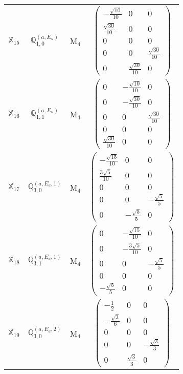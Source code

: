 \documentclass[fleqn,10pt,landscape]{article}
\begin{document}
\begin{itemize}
\begin{center}
\begin{longtable}{c|c|c|c}
$ \mathbb{X}_{15} $ & $\mathbb{Q}_{1,0}^{(a,E_{u})}$ & M$_{4}$ & $\begin{pmatrix} - \frac{\sqrt{10}}{10} & 0 & 0 \\ \frac{\sqrt{30}}{10} & 0 & 0 \\ 0 & 0 & 0 \\ 0 & 0 & \frac{\sqrt{30}}{10} \\ 0 & \frac{\sqrt{30}}{10} & 0 \end{pmatrix}$ \\
$ \mathbb{X}_{16} $ & $\mathbb{Q}_{1,1}^{(a,E_{u})}$ & M$_{4}$ & $\begin{pmatrix} 0 & - \frac{\sqrt{10}}{10} & 0 \\ 0 & - \frac{\sqrt{30}}{10} & 0 \\ 0 & 0 & \frac{\sqrt{30}}{10} \\ 0 & 0 & 0 \\ \frac{\sqrt{30}}{10} & 0 & 0 \end{pmatrix}$ \\
$ \mathbb{X}_{17} $ & $\mathbb{Q}_{3,0}^{(a,E_{u},1)}$ & M$_{4}$ & $\begin{pmatrix} - \frac{\sqrt{15}}{10} & 0 & 0 \\ \frac{3 \sqrt{5}}{10} & 0 & 0 \\ 0 & 0 & 0 \\ 0 & 0 & - \frac{\sqrt{5}}{5} \\ 0 & - \frac{\sqrt{5}}{5} & 0 \end{pmatrix}$ \\
$ \mathbb{X}_{18} $ & $\mathbb{Q}_{3,1}^{(a,E_{u},1)}$ & M$_{4}$ & $\begin{pmatrix} 0 & - \frac{\sqrt{15}}{10} & 0 \\ 0 & - \frac{3 \sqrt{5}}{10} & 0 \\ 0 & 0 & - \frac{\sqrt{5}}{5} \\ 0 & 0 & 0 \\ - \frac{\sqrt{5}}{5} & 0 & 0 \end{pmatrix}$ \\
$ \mathbb{X}_{19} $ & $\mathbb{Q}_{3,0}^{(a,E_{u},2)}$ & M$_{4}$ & $\begin{pmatrix} - \frac{1}{2} & 0 & 0 \\ - \frac{\sqrt{3}}{6} & 0 & 0 \\ 0 & 0 & 0 \\ 0 & 0 & - \frac{\sqrt{3}}{3} \\ 0 & \frac{\sqrt{3}}{3} & 0 \end{pmatrix}$ \\

\end{longtable}
\end{center}
\end{itemize}
\end{document}
